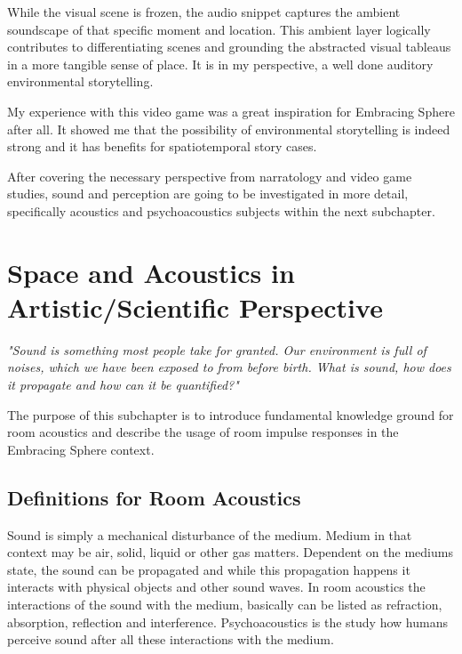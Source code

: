             While the visual scene is frozen, the audio snippet captures the ambient soundscape of that specific moment and location. This ambient layer logically contributes to differentiating scenes and grounding the abstracted visual tableaus in a more tangible sense of place. It is in my perspective, a well done auditory environmental storytelling.\par           

            My experience with this video game was a great inspiration for Embracing Sphere after all. It showed me that the possibility of environmental storytelling is indeed strong and it has benefits for spatiotemporal story cases.\par

            After covering the necessary perspective from narratology and video game studies, sound and perception are going to be investigated in more detail, specifically acoustics and psychoacoustics subjects within the next subchapter.
    \section{Space and Acoustics in Artistic/Scientific Perspective}
            \emph{"Sound is something most people take for granted. Our environment is full of noises, which we have been exposed to from before birth. What is sound, how does it propagate and how can it be quantified?"\cite{Acoustics_and_Psychophysics}}\par 

            The purpose of this subchapter is to introduce fundamental knowledge ground for room acoustics and describe the usage of room impulse responses in the Embracing Sphere context.\par
        \subsection{Definitions for Room Acoustics}
            Sound is simply a mechanical disturbance of the medium. Medium in that context may be air, solid, liquid or other gas matters. Dependent on the mediums state, the sound can be propagated and while this propagation happens it interacts with physical objects and other sound waves. In room acoustics the interactions of the sound with the medium, basically can be listed as refraction, absorption, reflection and interference. Psychoacoustics is the study how humans perceive sound after all these interactions with the medium\cite{Acoustics_and_Psychophysics}.\par

